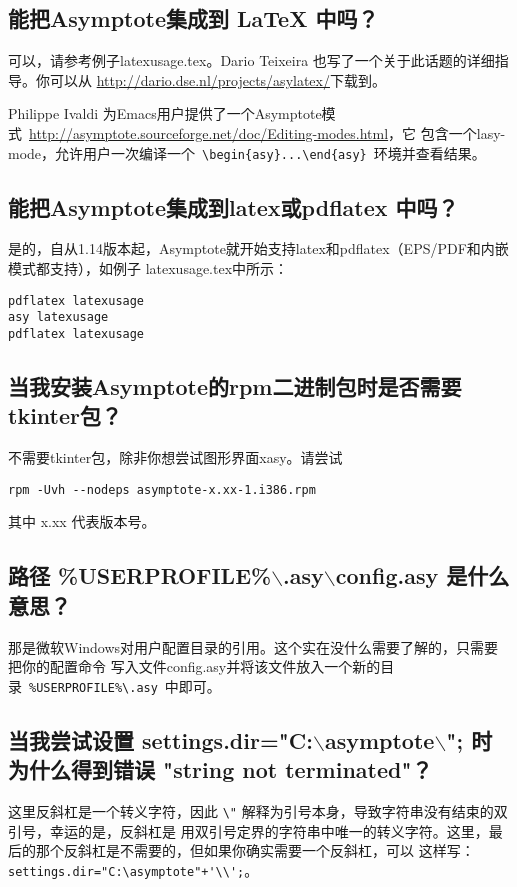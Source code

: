 \subsection{\label{Q2.6}能把Asymptote集成到 LaTeX 中吗？}
可以，请参考例子latexusage.tex。Dario Teixeira 也写了一个关于此话题的详细指导。你可以从
\url{http://dario.dse.nl/projects/asylatex/}下载到。

Philippe Ivaldi 为Emacs用户提供了一个Asymptote模式~\url{http://asymptote.sourceforge.net/doc/Editing-modes.html}，它
包含一个lasy-mode，允许用户一次编译一个~\verb|\begin{asy}...\end{asy}|~环境并查看结果。

\subsection{\label{Q2.7}能把Asymptote集成到latex或pdflatex 中吗？}
是的，自从1.14版本起，Asymptote就开始支持latex和pdflatex（EPS/PDF和内嵌模式都支持），如例子 latexusage.tex中所示：
\begin{verbatim}
pdflatex latexusage
asy latexusage
pdflatex latexusage
\end{verbatim}

\subsection{\label{Q2.8}当我安装Asymptote的rpm二进制包时是否需要tkinter包？}
不需要tkinter包，除非你想尝试图形界面xasy。请尝试
\begin{verbatim}
rpm -Uvh --nodeps asymptote-x.xx-1.i386.rpm
\end{verbatim}
其中 x.xx 代表版本号。 

\subsection{\label{Q2.9}路径 \%USERPROFILE\%$\backslash$.asy$\backslash$config.asy 是什么意思？}
那是微软Windows对用户配置目录的引用。这个实在没什么需要了解的，只需要把你的配置命令
写入文件config.asy并将该文件放入一个新的目录~\verb|%USERPROFILE%\.asy|~中即可。

\subsection{\label{Q2.10}当我尝试设置 settings.dir="C:$\backslash$asymptote$\backslash$"; 时为什么得到错误 
       "string not terminated"？}
这里反斜杠是一个转义字符，因此 \verb|\"| 解释为引号本身，导致字符串没有结束的双引号，幸运的是，反斜杠是
用双引号定界的字符串中唯一的转义字符。这里，最后的那个反斜杠是不需要的，但如果你确实需要一个反斜杠，可以
这样写：\verb|settings.dir="C:\asymptote"+'\\';|。

